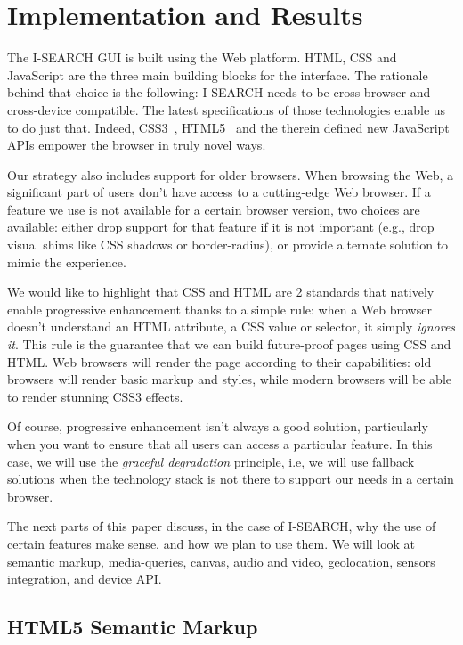 \documentclass[runningheads,a4paper]{llncs} \usepackage[utf8]{inputenc}
\begin{document}
\section{Implementation and Results}

The \mbox{I-SEARCH} GUI is built using the Web platform. HTML, CSS and
JavaScript are the three main building blocks for the interface. The rationale
behind that choice is the following: \mbox{I-SEARCH} needs to be cross-browser
and cross-device compatible. The latest specifications of those technologies
enable us to do just that. Indeed, CSS3~\cite{css3}, HTML5~\cite{html5} and the
therein defined new JavaScript APIs empower the browser in truly novel ways.

Our strategy also includes support for older browsers. When browsing the Web, a
significant part of users don't have access to a cutting-edge Web browser. If a
feature we use is not available for a certain browser version, two choices are
available: either drop support for that feature if it is not important (e.g.,
drop visual shims like CSS shadows or border-radius), or provide alternate
solution to mimic the experience.

We would like to highlight that CSS and HTML are 2 standards that natively
enable progressive enhancement thanks to a simple rule: when a Web browser
doesn't understand an HTML attribute, a CSS value or selector, it simply
\emph{ignores it}. This rule is the guarantee that we can build future-proof
pages using CSS and HTML. Web browsers will render the page according to their
capabilities: old browsers will render basic markup and styles, while modern
browsers will be able to render stunning CSS3 effects.

Of course, progressive enhancement isn't always a good solution, particularly
when you want to ensure that all users can access a particular feature. In this
case, we will use the \emph{graceful degradation} principle, i.e, we will use
fallback solutions when the technology stack is not there to support our needs
in a certain browser.

The next parts of this paper discuss, in the case of \mbox{I-SEARCH}, why the
use of certain features make sense, and how we plan to use them. We will look at
semantic markup, media-queries, canvas, audio and video, geolocation, sensors
integration, and device API.

\subsection{HTML5 Semantic Markup} 
\end{document}
